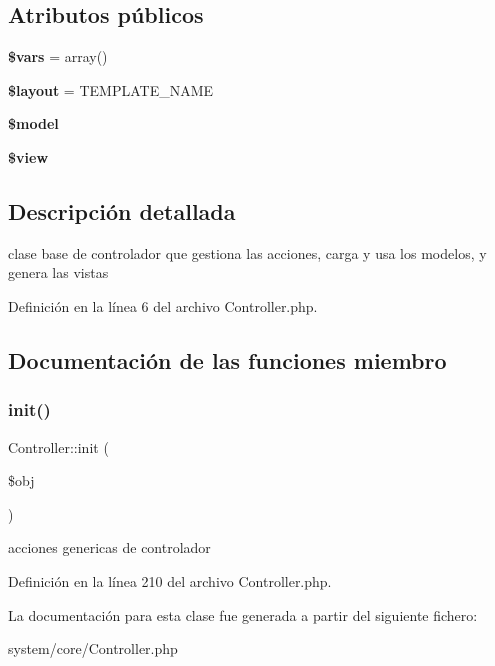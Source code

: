 \subsection*{Atributos públicos}
\begin{DoxyCompactItemize}
\item 
\mbox{\label{class_controller_a51a84d4b2aad22b65fca3976550fa31e}} 
{\bfseries \$vars} = array()
\item 
\mbox{\label{class_controller_aea20fa396e0fa1b8a500e7b8276e4d9a}} 
{\bfseries \$layout} = T\+E\+M\+P\+L\+A\+T\+E\+\_\+\+N\+A\+ME
\item 
\mbox{\label{class_controller_a4078f8d070afa3d19a462422fa1a3547}} 
{\bfseries \$model}
\item 
\mbox{\label{class_controller_aeb713d8b3c9bf61c72c4fcabd0e1e48a}} 
{\bfseries \$view}
\end{DoxyCompactItemize}


\subsection{Descripción detallada}
clase base de controlador que gestiona las acciones, carga y usa los modelos, y genera las vistas 

Definición en la línea 6 del archivo Controller.\+php.



\subsection{Documentación de las funciones miembro}
\mbox{\label{class_controller_a628beb30f4b8e9158a41e228671cf5aa}} 
\subsubsection{\texorpdfstring{init()}{init()}}
{\footnotesize\ttfamily Controller\+::init (\begin{DoxyParamCaption}\item[{}]{\$obj }\end{DoxyParamCaption})}

acciones genericas de controlador 

Definición en la línea 210 del archivo Controller.\+php.



La documentación para esta clase fue generada a partir del siguiente fichero\+:\begin{DoxyCompactItemize}
\item 
system/core/Controller.\+php\end{DoxyCompactItemize}
